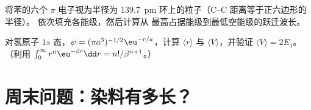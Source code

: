 \begin{exercise}[$\star\star\star$]\label{exo:b3:quantum-model-systems:11}
将苯的六个 $\pi$ 电子视为半径为
\qty{139.7}{pm} 环上的粒子（C--C 距离等于正六边形的半径）。
依次填充各能级，然后计算从
最高占据能级到最低空能级的跃迁波长。
\end{exercise}

\begin{exercise}[$\star\star\star$]\label{exo:b3:quantum-model-systems:12}
对氢原子 $1s$ 态，$\psi = (\pi a^3)^{-1/2}\eu^{-r/a}$，计算
 $\langle r\rangle$ 与 $\langle V\rangle$，并验证
$\langle V\rangle = 2E_1$。（利用 $\int_0^\infty r^n\eu^{-\beta r}\dd r =
n!/\beta^{n+1}$。）
\end{exercise}

\section{周末问题：染料有多长？}


